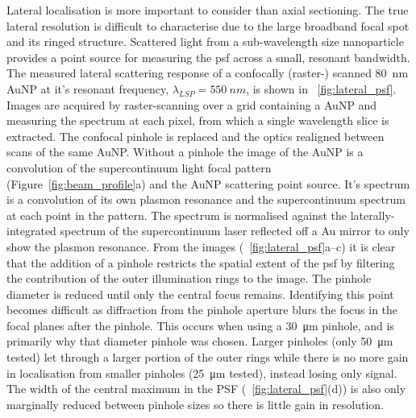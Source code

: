 \documentclass{article}
\begin{document}
Lateral localisation is more important to consider than axial sectioning. The true lateral resolution is difficult to characterise due to the large broadband focal spot and its ringed structure. Scattered light from a sub-wavelength size nanoparticle provides a point source for measuring the \gls{psf} across a small, resonant bandwidth. The measured lateral scattering response of a confocally (raster-) scanned \SI{80}{nm} AuNP at it's resonant frequency, $\lambda_{LSP} = \SI{550}{nm}$, is shown in \figurename~\ref{fig:lateral_psf}. Images are acquired by raster-scanning over a grid containing a AuNP and measuring the spectrum at each pixel, from which a single wavelength slice is extracted. The confocal pinhole is replaced and the optics realigned between scans of the same AuNP.
Without a pinhole the image of the AuNP is a convolution of the supercontinuum light focal pattern (Figure~\ref{fig:beam_profile}a) and the AuNP scattering point source. It's spectrum is a convolution of its own plasmon resonance and the supercontinuum spectrum at each point in the pattern. The spectrum is normalised against the laterally-integrated spectrum of the supercontinuum laser reflected off a Au mirror to only show the plasmon resonance.
From the images (\figurename~\ref{fig:lateral_psf}a--c) it is clear that the addition of a pinhole restricts the spatial extent of the \gls{psf} by filtering the contribution of the outer illumination rings to the image. The pinhole diameter is reduced until only the central focus remains. Identifying this point becomes difficult as diffraction from the pinhole aperture blurs the focus in the focal planes after the pinhole. This occurs when using a \SI{30}{\micro\metre} pinhole, and is primarily why that diameter pinhole was chosen. Larger pinholes (only \SI{50}{\micro\metre} tested) let through a larger portion of the outer rings while there is no more gain in localisation from smaller pinholes (\SI{25}{\micro\metre} tested), instead losing only signal. The width of the central maximum in the PSF (\figurename~\ref{fig:lateral_psf}(d)) is also only marginally reduced between pinhole sizes so there is little gain in resolution.
\end{document}
